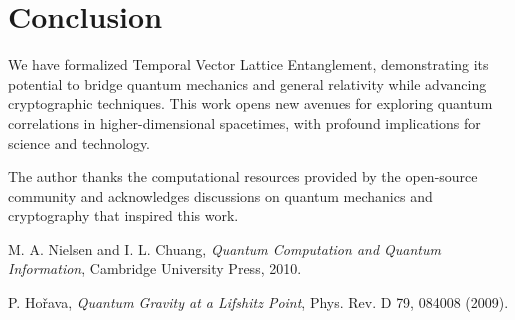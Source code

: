\documentclass[aps,prl,twocolumn,superscriptaddress]{revtex4-2}
\begin{document}
\section{Conclusion}

We have formalized Temporal Vector Lattice Entanglement, demonstrating its potential to bridge quantum mechanics and general relativity while advancing cryptographic techniques. This work opens new avenues for exploring quantum correlations in higher-dimensional spacetimes, with profound implications for science and technology.

\begin{acknowledgments}
The author thanks the computational resources provided by the open-source community and acknowledges discussions on quantum mechanics and cryptography that inspired this work.
\end{acknowledgments}

\begin{thebibliography}{9}
M. A. Nielsen and I. L. Chuang, \textit{Quantum Computation and Quantum Information}, Cambridge University Press, 2010.

P. Hořava, \textit{Quantum Gravity at a Lifshitz Point}, Phys. Rev. D 79, 084008 (2009).
\end{thebibliography}
\end{document}
